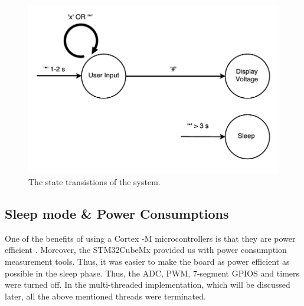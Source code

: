 \documentclass[a4paper,titlepage]{article}
\begin{document}
\begin{figure}[!htb]
  \centering
  \includegraphics[width=\columnwidth]{figures/state_transitions.png}
  \caption
  {The state transistions of the system.}
  \label{fig:state_transitions}
\end{figure}

\subsection{Sleep mode \& Power Consumptions}

One of the benefits of using a Cortex -M microcontrollers is that they are power efficient \cite{yiu}. Moreover, the STM32CubeMx provided us with power consumption measurement tools. Thus, it was easier to make the board as power efficient as possible in the sleep phase. Thus, the ADC, PWM, 7-segment GPIOS and timers were turned off. In the multi-threaded implementation, which will be discussed later, all the above mentioned threads were terminated.
\end{document}
